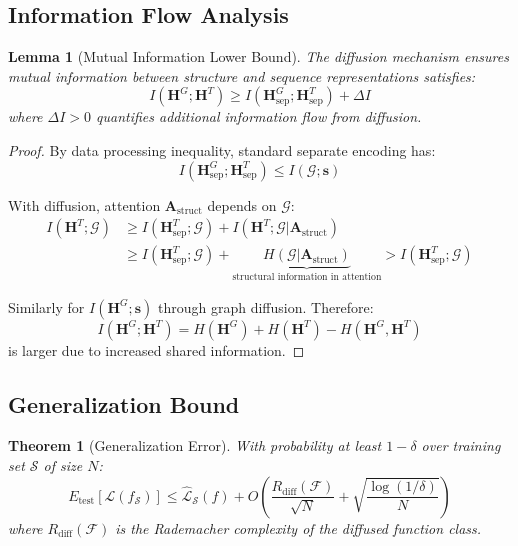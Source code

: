 \documentclass[11pt]{article}
\newtheorem{theorem}{Theorem}
\newtheorem{proof}{Proof}
\newtheorem{lemma}{Lemma}
\begin{document}
\subsection{Information Flow Analysis}

\begin{lemma}[Mutual Information Lower Bound]
The diffusion mechanism ensures mutual information between structure and sequence representations satisfies:
\begin{equation}
    I(\mathbf{H}^G; \mathbf{H}^T) \geq I(\mathbf{H}_{\text{sep}}^G; \mathbf{H}_{\text{sep}}^T) + \Delta I
\end{equation}
where $\Delta I > 0$ quantifies additional information flow from diffusion.
\end{lemma}

\begin{proof}
By data processing inequality, standard separate encoding has:
\begin{equation}
    I(\mathbf{H}_{\text{sep}}^G; \mathbf{H}_{\text{sep}}^T) \leq I(\mathcal{G}; \mathbf{s})
\end{equation}

With diffusion, attention $\mathbf{A}_{\text{struct}}$ depends on $\mathcal{G}$:
\begin{align}
    I(\mathbf{H}^T; \mathcal{G}) &\geq I(\mathbf{H}_{\text{sep}}^T; \mathcal{G}) + I(\mathbf{H}^T; \mathcal{G} | \mathbf{A}_{\text{struct}}) \\
    &\geq I(\mathbf{H}_{\text{sep}}^T; \mathcal{G}) + \underbrace{H(\mathcal{G} | \mathbf{A}_{\text{struct}})}_{\text{structural information in attention}} > I(\mathbf{H}_{\text{sep}}^T; \mathcal{G})
\end{align}

Similarly for $I(\mathbf{H}^G; \mathbf{s})$ through graph diffusion. Therefore:
\begin{equation}
    I(\mathbf{H}^G; \mathbf{H}^T) = H(\mathbf{H}^G) + H(\mathbf{H}^T) - H(\mathbf{H}^G, \mathbf{H}^T)
\end{equation}
is larger due to increased shared information.
\end{proof}

\subsection{Generalization Bound}

\begin{theorem}[Generalization Error]
With probability at least $1-\delta$ over training set $\mathcal{S}$ of size $N$:
\begin{equation}
    E_{\text{test}}[\mathcal{L}(f_{\mathcal{S}})] \leq \hat{\mathcal{L}}_{\mathcal{S}}(f) + O\left(\frac{R_{\text{diff}}(\mathcal{F})}{\sqrt{N}} + \sqrt{\frac{\log(1/\delta)}{N}}\right)
\end{equation}
where $R_{\text{diff}}(\mathcal{F})$ is the Rademacher complexity of the diffused function class.
\end{theorem}
\end{document}

